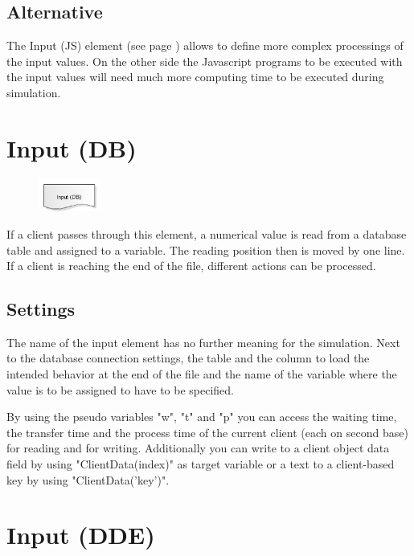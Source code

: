 \subsection*{Alternative}

The Input (JS) element (see page \pageref{ref:ModelElementInputJS}) allows to define more complex processings
of the input values. On the other side the Javascript programs to be executed with the input values
will need much more computing time to be executed during simulation.


\section{Input (DB)}
\label{ref:ModelElementInputDB}

\begin{figure}
\vspace{-22pt}
\includegraphics[width=2cm]{imageModelElementInputDB.png}
\vspace{-22pt}
\end{figure}

If a client passes through this element, a numerical value is read from a
database table and assigned to a variable. The reading position then is moved by one line.
If a client is reaching the end of the file, different actions can be processed.

\subsection*{Settings}

The name of the input element has no further meaning for the simulation.
Next to the database connection settings, the table and the column to load
the intended behavior at the end of the file and the name of the variable
where the value is to be assigned to have to be specified.

By using the pseudo variables "w", "t" and "p" you can access the waiting time, the transfer time and the
process time of the current client (each on second base) for reading and for writing. Additionally you can
write to a client object data field by using "ClientData(index)" as target variable or a text to a client-based
key by using "ClientData('key')".


\section{Input (DDE)}
\label{ref:ModelElementInputDDE}

